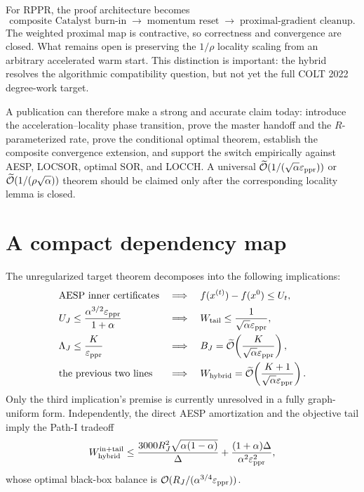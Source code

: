 For RPPR, the proof architecture becomes
\[
  \boxed{
  \text{composite Catalyst burn-in}
  \;\longrightarrow\;
  \text{momentum reset}
  \;\longrightarrow\;
  \text{proximal-gradient cleanup}.}
\]
The weighted proximal map is contractive, so correctness and convergence are
closed. What remains open is preserving the $1/\rho$ locality scaling from an
arbitrary accelerated warm start. This distinction is important: the hybrid
resolves the algorithmic compatibility question, but not yet the full COLT
2022 degree-work target.

A publication can therefore make a strong and accurate claim today: introduce
the acceleration--locality phase transition, prove the master handoff and the
$R$-parameterized rate, prove the conditional optimal theorem, establish the
composite convergence extension, and support the switch empirically against
AESP, LOCSOR, optimal SOR, and LOCCH. A universal
$\widetilde{\mathcal{O}}(1/(\sqrt\alpha\varepsilon_{\mathrm{ppr}}))$ or
$\widetilde{\mathcal{O}}(1/(\rho\sqrt\alpha))$ theorem should be claimed only after the
corresponding locality lemma is closed.

\appendix

\section{A compact dependency map}
\label{app:dependency}

The unregularized target theorem decomposes into the following implications:
\begin{align*}
  &\text{AESP inner certificates}
    &&\Longrightarrow\quad
      f(x^{(t)})-f(x^0)\leq U_t,\\
  &U_J\leq\frac{\alpha^{3/2}\varepsilon_{\mathrm{ppr}}}{1+\alpha}
    &&\Longrightarrow\quad
      W_{\rm tail}\leq\frac1{\sqrt\alpha\varepsilon_{\mathrm{ppr}}},\\
  &\Lambda_J\leq\frac{K}{\varepsilon_{\mathrm{ppr}}}
    &&\Longrightarrow\quad
      B_J=\widetilde{\mathcal{O}}\!\left(\frac{K}{\sqrt\alpha\varepsilon_{\mathrm{ppr}}}\right),\\
  &\text{the previous two lines}
    &&\Longrightarrow\quad
      W_{\rm hybrid}
      =\widetilde{\mathcal{O}}\!\left(\frac{K+1}{\sqrt\alpha\varepsilon_{\mathrm{ppr}}}\right).
\end{align*}
Only the third implication's premise is currently unresolved in a fully
graph-uniform form. Independently, the direct AESP amortization and the
objective tail imply the Path-I tradeoff
\[
  W_{\rm hybrid}^{\rm in+tail}
  \leq
  \frac{3000R_J^2\sqrt{\alpha(1-\alpha)}}{\Delta}
  +\frac{(1+\alpha)\Delta}{\alpha^2\varepsilon_{\mathrm{ppr}}^2},
\]
whose optimal black-box balance is
$\mathcal{O}(R_J/(\alpha^{3/4}\varepsilon_{\mathrm{ppr}}))$.

